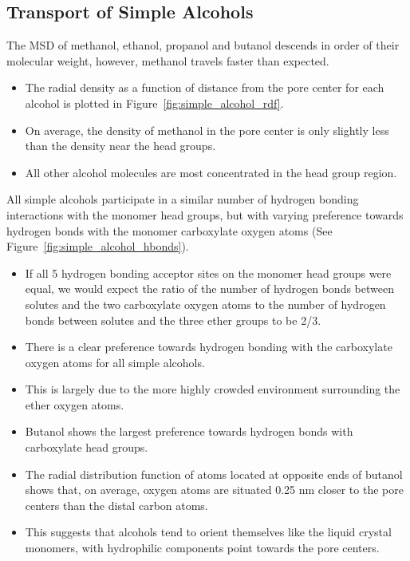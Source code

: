 \documentclass{article}
\begin{document}
  
  \subsection*{Transport of Simple Alcohols}

  The MSD of methanol, ethanol, propanol and butanol descends in order of 
  their molecular weight, however, methanol travels faster than expected.  %
  \begin{itemize}  
    \item The radial density as a function of distance from the pore center
    for each alcohol is plotted in Figure~\ref{fig:simple_alcohol_rdf}.
    \item On average, the density of methanol in the pore center is only slightly
    less than the density near the head groups.
    \item All other alcohol molecules are most concentrated in the head group region.
  \end{itemize}
  
  All simple alcohols participate in a similar number of hydrogen bonding interactions
  with the monomer head groups, but with varying preference towards hydrogen bonds with
  the monomer carboxylate oxygen atoms (See Figure~\ref{fig:simple_alcohol_hbonds}).
  \begin{itemize}
  	\item If all 5 hydrogen bonding acceptor sites on the monomer head groups were equal,
  	we would expect the ratio of the number of hydrogen bonds between solutes and the two 
  	carboxylate oxygen atoms to the number of hydrogen bonds between solutes and the three
  	ether groups to be 2/3. 
  	\item There is a clear preference towards hydrogen bonding with the carboxylate 
  	oxygen atoms for all simple alcohols.
  	\item This is largely due to the more highly crowded environment surrounding the ether
  	oxygen atoms.
  	\item Butanol shows the largest preference towards hydrogen bonds with carboxylate 
  	head groups.
  	\item The radial distribution function of atoms located at opposite ends of butanol
  	shows that, on average, oxygen atoms are situated 0.25 nm closer to the pore centers
  	than the distal carbon atoms.
  	\item This suggests that alcohols tend to orient themselves like the liquid crystal 
  	monomers, with hydrophilic components point towards the pore centers.
  \end{itemize}
  
\end{document}
